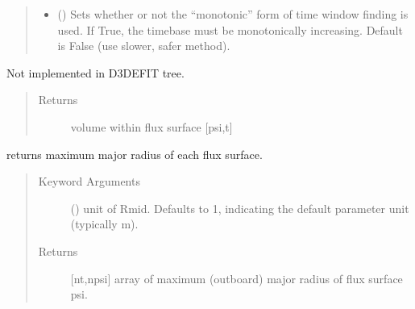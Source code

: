 \documentclass[letterpaper,10pt,english]{sphinxmanual}
\begin{document}
\begin{fulllineitems}
\begin{quote}
\begin{description}
\begin{itemize}
\item {} 
 () \textendash{} Sets whether or not the “monotonic” form of time
window finding is used. If True, the timebase must be monotonically
increasing. Default is False (use slower, safer method).

\end{itemize}

\end{description}\end{quote}

\begin{fulllineitems}
\label{\detokenize{eqtools:eqtools.D3DEFIT.D3DEFITTree.getFluxVol}}
Not implemented in D3DEFIT tree.
\begin{quote}\begin{description}
\item[{Returns}] \leavevmode
volume within flux surface {[}psi,t{]}

\end{description}\end{quote}

\end{fulllineitems}


\begin{fulllineitems}
\label{\detokenize{eqtools:eqtools.D3DEFIT.D3DEFITTree.getRmidPsi}}
returns maximum major radius of each flux surface.
\begin{quote}\begin{description}
\item[{Keyword Arguments}] \leavevmode
{} () \textendash{} unit of Rmid.  Defaults to 1, indicating
the default parameter unit (typically m).

\item[{Returns}] \leavevmode
{[}nt,npsi{]} array of maximum (outboard) major radius of
flux surface psi.


\end{description}
\end{quote}
\end{fulllineitems}
\end{fulllineitems}
\end{document}

